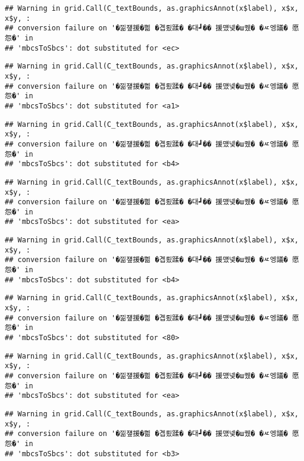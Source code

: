 \documentclass[
]{article}
\begin{document}
\begin{verbatim}
## Warning in grid.Call(C_textBounds, as.graphicsAnnot(x$label), x$x, x$y, :
## conversion failure on '�낆쟾援�쁾 �곕룄蹂� �대┛�� 援먰넻�ш퀬� �ㅼ엥議� 愿怨�' in
## 'mbcsToSbcs': dot substituted for <ec>
\end{verbatim}

\begin{verbatim}
## Warning in grid.Call(C_textBounds, as.graphicsAnnot(x$label), x$x, x$y, :
## conversion failure on '�낆쟾援�쁾 �곕룄蹂� �대┛�� 援먰넻�ш퀬� �ㅼ엥議� 愿怨�' in
## 'mbcsToSbcs': dot substituted for <a1>
\end{verbatim}

\begin{verbatim}
## Warning in grid.Call(C_textBounds, as.graphicsAnnot(x$label), x$x, x$y, :
## conversion failure on '�낆쟾援�쁾 �곕룄蹂� �대┛�� 援먰넻�ш퀬� �ㅼ엥議� 愿怨�' in
## 'mbcsToSbcs': dot substituted for <b4>
\end{verbatim}

\begin{verbatim}
## Warning in grid.Call(C_textBounds, as.graphicsAnnot(x$label), x$x, x$y, :
## conversion failure on '�낆쟾援�쁾 �곕룄蹂� �대┛�� 援먰넻�ш퀬� �ㅼ엥議� 愿怨�' in
## 'mbcsToSbcs': dot substituted for <ea>
\end{verbatim}

\begin{verbatim}
## Warning in grid.Call(C_textBounds, as.graphicsAnnot(x$label), x$x, x$y, :
## conversion failure on '�낆쟾援�쁾 �곕룄蹂� �대┛�� 援먰넻�ш퀬� �ㅼ엥議� 愿怨�' in
## 'mbcsToSbcs': dot substituted for <b4>
\end{verbatim}

\begin{verbatim}
## Warning in grid.Call(C_textBounds, as.graphicsAnnot(x$label), x$x, x$y, :
## conversion failure on '�낆쟾援�쁾 �곕룄蹂� �대┛�� 援먰넻�ш퀬� �ㅼ엥議� 愿怨�' in
## 'mbcsToSbcs': dot substituted for <80>
\end{verbatim}

\begin{verbatim}
## Warning in grid.Call(C_textBounds, as.graphicsAnnot(x$label), x$x, x$y, :
## conversion failure on '�낆쟾援�쁾 �곕룄蹂� �대┛�� 援먰넻�ш퀬� �ㅼ엥議� 愿怨�' in
## 'mbcsToSbcs': dot substituted for <ea>
\end{verbatim}

\begin{verbatim}
## Warning in grid.Call(C_textBounds, as.graphicsAnnot(x$label), x$x, x$y, :
## conversion failure on '�낆쟾援�쁾 �곕룄蹂� �대┛�� 援먰넻�ш퀬� �ㅼ엥議� 愿怨�' in
## 'mbcsToSbcs': dot substituted for <b3>
\end{verbatim}
\end{document}
